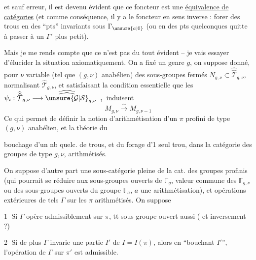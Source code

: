 
et sauf erreur, il est devenu évident
que ce foncteur est une \uline{équivalence de
catégories} (et comme conséquence, il
y a le foncteur en sens inverse :
forer des trous en des ``pts'' invariants
sous $\Gamma_{\unsure{a|0}}$ (ou en des pts quelconques
quitte à passer à un $\Gamma'$ plus petit).

Mais je me rends compte que
 ce n'est pas du tout évident -- je vais
essayer d'élucider la situation axiomatiquement.
On a fixé un genre $g$,
on suppose donné, pour $\nu$ variable
(tel que $(g,\nu)$ anabélien) des
sous-groupes fermés $N_{g,\nu}\subset\widehat{\widehat{\mathcal T}}_{g,\nu}$,
normalisant $\widehat{\mathcal T}_{g,\nu}$, et satisfaisant la
condition essentielle que les $\psi_i:\widehat{\widehat{\mathcal T}}_{g,\nu}\longrightarrow\widehat{\widehat{\unsure{\mathcal G|\mathcal S}}}_{g,\nu-1}$
induisent
\[
M_{g,\nu}\xrightarrow{\sim}M_{g,\nu-1}
\]
Ce qui permet de définir la notion
d'arithmétisation d'un $\pi$ profini de
type $(g,\nu)$ anabélien, et la théorie du


bouchage d'un nb quelc. de trous, et
du forage d'1 seul trou, dans la
catégorie des groupes de type $g,\nu$,
arithmétisés.

On suppose d'autre part  une
sous-catégorie pleine de la cat. des groupes
profinis (qui pourrait se réduire aux
sous-groupes ouverts de $\mathbb{\Gamma}_g$, valeur
commune des $\mathbb{\Gamma}_{g,\nu}$ ou des sous-groupes
ouverts du groupe $\mathbb{\Gamma}_a$, $a$ une
arithmétisation), et  opérations
extérieures  de tels $\Gamma$ sur les
$\pi$ arithmétisés. On suppose

\textcircled{1} Si $\Gamma$ opère admissiblement sur $\pi$, tt
sous-groupe ouvert aussi ( et inversement ?)

\textcircled{2} Si de plus $\Gamma$ invarie une partie $I'$
de $I=I(\pi)$, alors en ``bouchant $I'$'',
l'opération de $\Gamma$ sur $\pi'$ est admissible.


